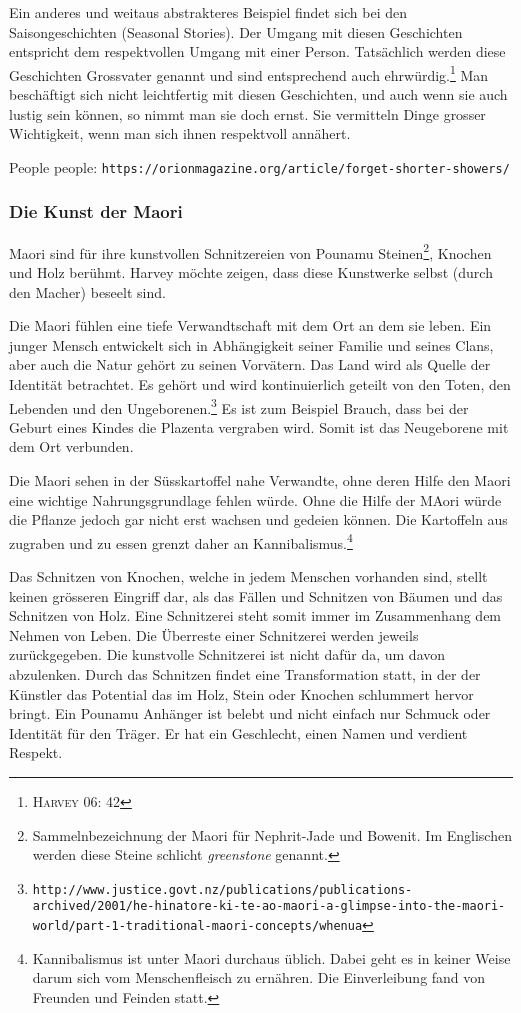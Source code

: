 Ein anderes und weitaus abstrakteres Beispiel findet sich bei den Saisongeschichten (Seasonal Stories). Der Umgang mit diesen Geschichten entspricht dem respektvollen Umgang mit einer Person. Tatsächlich werden diese Geschichten Grossvater genannt und sind entsprechend auch ehrwürdig.\footnote{\textsc{Harvey 06: 42}} Man beschäftigt sich nicht leichtfertig mit diesen Geschichten, und auch wenn sie auch lustig sein können, so nimmt man sie doch ernst. Sie vermitteln Dinge grosser Wichtigkeit, wenn man sich ihnen respektvoll annähert.

People people: \texttt{https://orionmagazine.org/article/forget-shorter-showers/}

\subsubsection*{Die Kunst der Maori}
Maori sind für ihre kunstvollen Schnitzereien von Pounamu Steinen\footnote{Sammelnbezeichnung der Maori für Nephrit-Jade und Bowenit. Im Englischen werden diese Steine schlicht \emph{greenstone} genannt.}, Knochen und Holz berühmt. Harvey möchte zeigen, dass diese Kunstwerke selbst (durch den Macher) beseelt sind. 

Die Maori fühlen eine tiefe Verwandtschaft mit dem Ort an dem sie leben. Ein junger Mensch entwickelt sich in Abhängigkeit seiner Familie und seines Clans, aber auch die Natur gehört zu seinen Vorvätern. Das Land wird als Quelle der Identität betrachtet. Es gehört und wird kontinuierlich geteilt von den Toten, den Lebenden und den Ungeborenen.\footnote{\texttt{http://www.justice.govt.nz/publications/publications-archived/2001/he-hinatore-ki-te-ao-maori-a-glimpse-into-the-maori-world/part-1-traditional-maori-concepts/whenua}} Es ist zum Beispiel Brauch, dass bei der Geburt eines Kindes die Plazenta vergraben wird. Somit ist das Neugeborene mit dem Ort verbunden.

Die Maori sehen in der Süsskartoffel nahe Verwandte, ohne deren Hilfe den Maori eine wichtige Nahrungsgrundlage fehlen würde. Ohne die Hilfe der MAori würde die Pflanze jedoch gar nicht erst wachsen und gedeien können. Die Kartoffeln aus zugraben und zu essen grenzt daher an Kannibalismus.\footnote{Kannibalismus ist unter Maori durchaus üblich. Dabei geht es in keiner Weise darum sich vom Menschenfleisch zu ernähren. Die Einverleibung fand von Freunden und Feinden statt.}

Das Schnitzen von Knochen, welche in jedem Menschen vorhanden sind, stellt keinen grösseren Eingriff dar, als das Fällen und Schnitzen von Bäumen und das Schnitzen von Holz. Eine Schnitzerei steht somit immer im Zusammenhang dem Nehmen von Leben. Die Überreste einer Schnitzerei werden jeweils zurückgegeben. Die kunstvolle Schnitzerei ist nicht dafür da, um davon abzulenken. Durch das Schnitzen findet eine Transformation statt, in der der Künstler das Potential das im Holz, Stein oder Knochen schlummert hervor bringt. Ein Pounamu Anhänger ist belebt und nicht einfach nur Schmuck oder Identität für den Träger. Er hat ein Geschlecht, einen Namen und verdient Respekt. 

